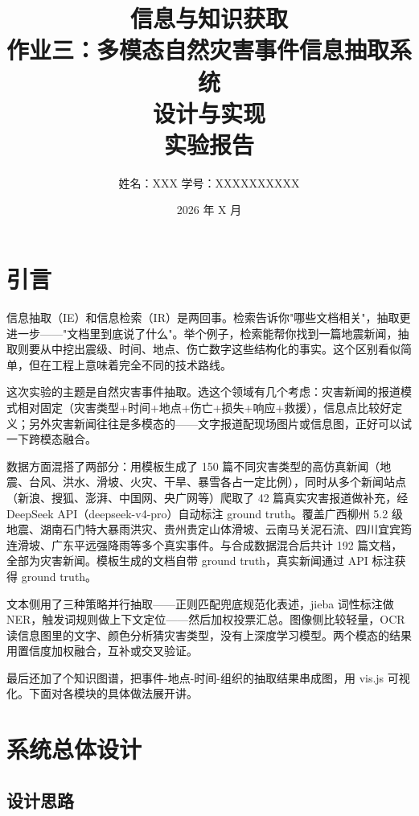 \documentclass[12pt, a4paper]{ctexart}
\title{
    \vspace{1cm}
    {\LARGE \textbf{信息与知识获取}} \\[0.6cm]
    {\Large 作业三：多模态自然灾害事件信息抽取系统} \\[0.3cm]
    {\Large 设计与实现} \\[0.4cm]
    {\large 实验报告}
    \vspace{0.5cm}
}
\author{
    姓名：XXX \quad 学号：XXXXXXXXXX \\[0.2cm]
}
\date{2026 年 X 月}
\begin{document}
\maketitle
\thispagestyle{empty}
\newpage
\setcounter{page}{1}
\tableofcontents
\newpage


\section{引言}

信息抽取（IE）和信息检索（IR）是两回事。检索告诉你"哪些文档相关"，抽取更进一步——"文档里到底说了什么"。举个例子，检索能帮你找到一篇地震新闻，抽取则要从中挖出震级、时间、地点、伤亡数字这些结构化的事实。这个区别看似简单，但在工程上意味着完全不同的技术路线。

这次实验的主题是自然灾害事件抽取。选这个领域有几个考虑：灾害新闻的报道模式相对固定（灾害类型+时间+地点+伤亡+损失+响应+救援），信息点比较好定义；另外灾害新闻往往是多模态的——文字报道配现场图片或信息图，正好可以试一下跨模态融合。

数据方面混搭了两部分：用模板生成了 150 篇不同灾害类型的高仿真新闻（地震、台风、洪水、滑坡、火灾、干旱、暴雪各占一定比例），同时从多个新闻站点（新浪、搜狐、澎湃、中国网、央广网等）爬取了 42 篇真实灾害报道做补充，经 DeepSeek API（deepseek-v4-pro）自动标注 ground truth。覆盖广西柳州 5.2 级地震、湖南石门特大暴雨洪灾、贵州贵定山体滑坡、云南马关泥石流、四川宜宾筠连滑坡、广东平远强降雨等多个真实事件。与合成数据混合后共计 192 篇文档，全部为灾害新闻。模板生成的文档自带 ground truth，真实新闻通过 API 标注获得 ground truth。

文本侧用了三种策略并行抽取——正则匹配兜底规范化表述，jieba 词性标注做 NER，触发词规则做上下文定位——然后加权投票汇总。图像侧比较轻量，OCR 读信息图里的文字、颜色分析猜灾害类型，没有上深度学习模型。两个模态的结果用置信度加权融合，互补或交叉验证。

最后还加了个知识图谱，把事件-地点-时间-组织的抽取结果串成图，用 vis.js 可视化。下面对各模块的具体做法展开讲。


\section{系统总体设计}

\subsection{设计思路}
\end{document}
